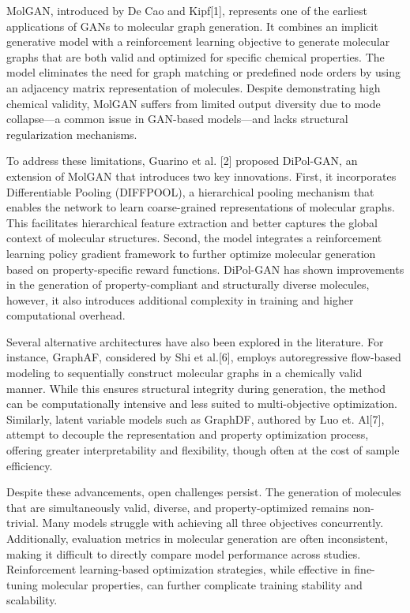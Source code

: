 \documentclass[conference]{IEEEtran}
\begin{document}
MolGAN, introduced by De Cao and Kipf[1], represents one of the earliest applications of GANs to molecular graph generation. It 
combines an implicit generative model with a reinforcement learning objective to generate molecular graphs that are both valid 
and optimized for specific chemical properties. The model eliminates the need for graph matching or predefined node orders by using 
an adjacency matrix representation of molecules. Despite demonstrating high chemical validity, MolGAN suffers from limited output 
diversity due to mode collapse—a common issue in GAN-based models—and lacks structural regularization mechanisms. 

To address these limitations, Guarino et al. [2] proposed DiPol-GAN, an extension of MolGAN that introduces two key innovations. First, 
it incorporates Differentiable Pooling (DIFFPOOL), a hierarchical pooling mechanism that enables the network to learn coarse-grained 
representations of molecular graphs. This facilitates hierarchical feature extraction and better captures the global context of molecular 
structures. Second, the model integrates a reinforcement learning policy gradient framework to further optimize molecular generation based
on property-specific reward functions. DiPol-GAN has shown improvements in the generation of property-compliant and structurally diverse 
molecules, however, it also introduces additional complexity in training and higher computational overhead. 

Several alternative architectures have also been explored in the literature. For instance, GraphAF, considered by Shi et al.[6], employs 
autoregressive flow-based modeling to sequentially construct molecular graphs in a chemically valid manner. While this ensures structural 
integrity during generation, the method can be computationally intensive and less suited to multi-objective optimization. Similarly, latent 
variable models such as GraphDF, authored by Luo et. Al[7], attempt to decouple the representation and property optimization process, offering 
greater interpretability and flexibility, though often at the cost of sample efficiency. 

Despite these advancements, open challenges persist. The generation of molecules that are simultaneously valid, diverse, and property-optimized 
remains non-trivial. Many models struggle with achieving all three objectives concurrently. Additionally, evaluation metrics in molecular 
generation are often inconsistent, making it difficult to directly compare model performance across studies. Reinforcement learning-based 
optimization strategies, while effective in fine-tuning molecular properties, can further complicate training stability and scalability. 
\end{document}
